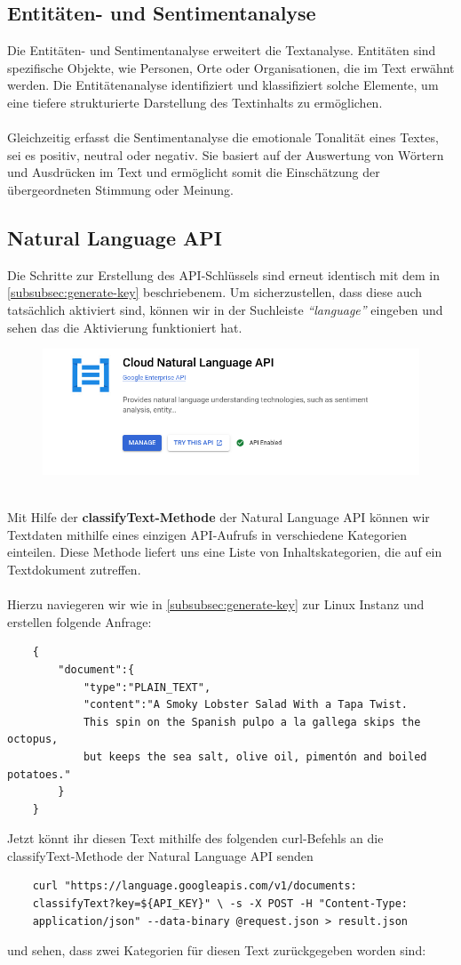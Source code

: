\documentclass[12pt,a4paper]{article}
\begin{document}
\subsection{Entitäten- und Sentimentanalyse}
Die Entitäten- und Sentimentanalyse erweitert die Textanalyse. Entitäten sind spezifische Objekte, wie Personen, Orte oder Organisationen, die im Text erwähnt werden. Die Entitätenanalyse identifiziert und klassifiziert solche Elemente, um eine tiefere strukturierte Darstellung des Textinhalts zu ermöglichen.
\\ \\
Gleichzeitig erfasst die Sentimentanalyse die emotionale Tonalität eines Textes, sei es positiv, neutral oder negativ. Sie basiert auf der Auswertung von Wörtern und Ausdrücken im Text und ermöglicht somit die Einschätzung der übergeordneten Stimmung oder Meinung.
\subsection{Natural Language API}
Die Schritte zur Erstellung des API-Schlüssels sind erneut identisch mit dem in \ref{subsubsec:generate-key} beschriebenem. Um sicherzustellen, dass diese auch tatsächlich aktiviert sind, können wir in der Suchleiste \textit{\enquote{language}} eingeben und sehen das die Aktivierung funktioniert hat.

\begin{figure}[h!]
	\centering
	\includegraphics[width=0.8\linewidth]{../images/cloud_NLP_API}
	\label{fig:cloudnlpapi}
\end{figure}
\ \\
Mit Hilfe der \textbf{classifyText-Methode} der Natural Language API können wir Textdaten mithilfe eines einzigen API-Aufrufs in verschiedene Kategorien einteilen. Diese Methode liefert uns eine Liste von Inhaltskategorien, die auf ein Textdokument zutreffen.
\\ \\
Hierzu naviegeren wir wie in \ref{subsubsec:generate-key} zur Linux Instanz und erstellen folgende Anfrage:
\begin{verbatim}
	{
		"document":{
			"type":"PLAIN_TEXT",
			"content":"A Smoky Lobster Salad With a Tapa Twist. 
			This spin on the Spanish pulpo a la gallega skips the octopus, 
			but keeps the sea salt, olive oil, pimentón and boiled potatoes."
		}
	}
\end{verbatim}
Jetzt könnt ihr diesen Text mithilfe des folgenden curl-Befehls an die classifyText-Methode der Natural Language API senden
\begin{verbatim}
	curl "https://language.googleapis.com/v1/documents:
	classifyText?key=${API_KEY}" \ -s -X POST -H "Content-Type: 
	application/json" --data-binary @request.json > result.json
\end{verbatim}
und sehen, dass zwei Kategorien für diesen Text zurückgegeben worden sind:
\end{document}
